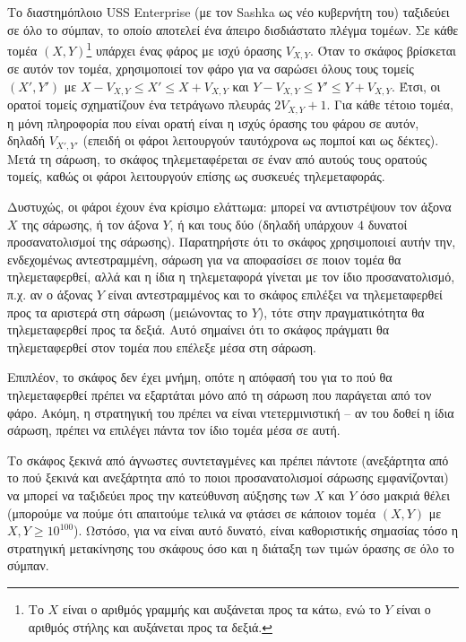 \documentclass[12pt]{article}
\begin{document}
\renewcommand{\headerLang}{Ελληνικά}
\renewcommand{\problemName}{AB13. Vision}

\renewcommand{\headerLeft}{IATI Μέρα 1, Senior κατηγορία}
\renewcommand{\headerRightFirst}{XVII INTERNATIONAL ADVANCED TOURNAMENT IN INFORMATICS}
\renewcommand{\headerRightSecond}{ONLINE 2026}

\renewcommand{\tl}{$5$ s}
\renewcommand{\ml}{$1024$ MB}
\problem{Πρόβλημα \problemName}

Το διαστημόπλοιο USS Enterprise (με τον Sashka ως νέο κυβερνήτη του) ταξιδεύει σε όλο το σύμπαν, το οποίο αποτελεί ένα άπειρο δισδιάστατο πλέγμα τομέων. Σε κάθε τομέα $(X, Y)$\footnote{Το $X$ είναι ο αριθμός γραμμής και αυξάνεται προς τα κάτω, ενώ το $Y$ είναι ο αριθμός στήλης και αυξάνεται προς τα δεξιά.} υπάρχει ένας φάρος με ισχύ όρασης $V_{X, Y}$. Όταν το σκάφος βρίσκεται σε αυτόν τον τομέα, χρησιμοποιεί τον φάρο για να σαρώσει όλους τους τομείς $(X', Y')$ με $X - V_{X, Y} \leq X' \leq X + V_{X, Y}$ και  $Y - V_{X, Y} \leq Y' \leq Y + V_{X, Y}$. Έτσι, οι ορατοί τομείς σχηματίζουν ένα τετράγωνο πλευράς $2V_{X, Y} + 1$. Για κάθε τέτοιο τομέα, η μόνη πληροφορία που είναι ορατή είναι η ισχύς όρασης του φάρου σε αυτόν, δηλαδή $V_{X', Y'}$ (επειδή οι φάροι λειτουργούν ταυτόχρονα ως πομποί και ως δέκτες). Μετά τη σάρωση, το σκάφος τηλεμεταφέρεται σε έναν από αυτούς τους ορατούς τομείς, καθώς οι φάροι λειτουργούν επίσης ως συσκευές τηλεμεταφοράς.

Δυστυχώς, οι φάροι έχουν ένα κρίσιμο ελάττωμα: μπορεί να αντιστρέψουν τον άξονα $X$ της σάρωσης, ή τον άξονα $Y$, ή και τους δύο (δηλαδή υπάρχουν $4$ δυνατοί προσανατολισμοί της σάρωσης). Παρατηρήστε ότι το σκάφος χρησιμοποιεί αυτήν την, ενδεχομένως αντεστραμμένη, σάρωση για να αποφασίσει σε ποιον τομέα θα τηλεμεταφερθεί, αλλά και η ίδια η τηλεμεταφορά γίνεται με τον ίδιο προσανατολισμό, π.χ. αν ο άξονας $Y$ είναι αντεστραμμένος και το σκάφος επιλέξει να τηλεμεταφερθεί προς τα αριστερά στη σάρωση (μειώνοντας το $Y$), τότε στην πραγματικότητα θα τηλεμεταφερθεί προς τα δεξιά. Αυτό σημαίνει ότι το σκάφος πράγματι θα τηλεμεταφερθεί στον τομέα που επέλεξε μέσα στη σάρωση.

Επιπλέον, το σκάφος δεν έχει μνήμη, οπότε η απόφασή του για το πού θα τηλεμεταφερθεί πρέπει να εξαρτάται μόνο από τη σάρωση που παράγεται από τον φάρο. Ακόμη, η στρατηγική του πρέπει να είναι ντετερμινιστική -- αν του δοθεί η ίδια σάρωση, πρέπει να επιλέγει πάντα τον ίδιο τομέα μέσα σε αυτή.

Το σκάφος ξεκινά από άγνωστες συντεταγμένες και πρέπει πάντοτε (ανεξάρτητα από το πού ξεκινά και ανεξάρτητα από το ποιοι προσανατολισμοί σάρωσης εμφανίζονται) να μπορεί να ταξιδεύει προς την κατεύθυνση αύξησης των $X$ και $Y$ όσο μακριά θέλει (μπορούμε να πούμε ότι απαιτούμε τελικά να φτάσει σε κάποιον τομέα $(X, Y)$ με $X, Y \geq 10^{100}$). Ωστόσο, για να είναι αυτό δυνατό, είναι καθοριστικής σημασίας τόσο η στρατηγική μετακίνησης του σκάφους όσο και η διάταξη των τιμών όρασης σε όλο το σύμπαν.
\end{document}
